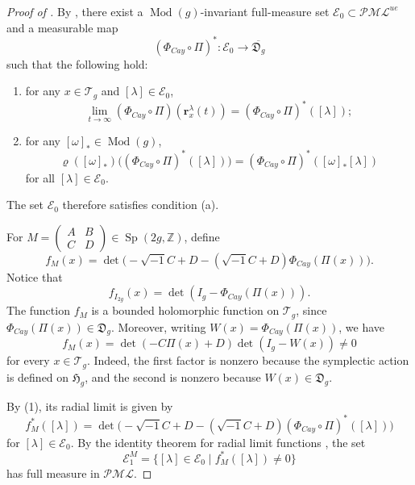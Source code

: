 \documentclass[dvipdfmx]{amsart}
\theoremstyle{remark}
\newcommand{\teich}{\mathcal{T}}
\newcommand{\tmod}{\operatorname{Mod}}
\newcommand{\ray}{{\boldsymbol r}}
\newcommand{\pml}{\mathcal{PML}}
\newcommand{\syp}{\mathop{Sp}}
\newcommand{\symrep}{\mathop{\boldsymbol{\varrho}}}
\newcommand{\Cayley}{\Phi_{C\!a\!y}}
\begin{document}
\begin{proof}[Proof of ]
By \cite[Theorem 3.1]{Miyachi2024Bounded},
there exist a $\tmod(g)$-invariant full-measure set
$\mathcal{E}_0\subset \mathcal{PML}^{ue}$ and a measurable map
\[
(\Cayley\circ\Pi)^*\colon
\mathcal E_0\to\overline{\mathfrak D_g}
\]
such that the following hold:
\begin{enumerate}
\item[(1)] for any $x\in \teich_{g}$ and $[\lambda]\in \mathcal{E}_0$,
\[
\lim_{t\to \infty}(\Cayley\circ\Pi)(\ray^{\lambda}_x(t))
=
(\Cayley\circ\Pi)^*([\lambda]);
\]
\item[(2)] for any $[\omega]_*\in \tmod(g)$,
\[
\symrep([\omega]_*)\bigl((\Cayley\circ\Pi)^*([\lambda])\bigr)
=
(\Cayley\circ\Pi)^*([\omega]_*[\lambda])
\]
for all $[\lambda]\in \mathcal{E}_0$.
\end{enumerate}
The set $\mathcal E_0$ therefore satisfies condition (a).

For
$M=\begin{pmatrix} A & B \\ C & D\end{pmatrix}\in \syp(2g,\mathbb{Z})$, define
\[
f_M(x)
=
\det\bigl(-\sqrt{-1}C+D-(\sqrt{-1}C+D)\Cayley(\Pi(x))\bigr).
\]
Notice that
\[
f_{I_{2g}}(x)=\det(I_g-\Cayley(\Pi(x))).
\]
The function $f_M$ is a bounded holomorphic function on $\teich_{g}$, since
$\Cayley(\Pi(x))\in \mathfrak{D}_g$.
Moreover, writing $W(x)=\Cayley(\Pi(x))$, we have
\[
f_M(x)
=
\det(-C\Pi(x)+D)\det(I_g-W(x))
\ne0
\]
for every $x\in\teich_g$.
Indeed, the first factor is nonzero because the
symplectic action is defined on $\mathfrak H_g$,
and the second is nonzero because
$W(x)\in\mathfrak D_g$.

By (1), its radial limit is given by
\[
f_M^*([\lambda])
=
\det\bigl(-\sqrt{-1}C+D-(\sqrt{-1}C+D)(\Cayley\circ \Pi)^*([\lambda])\bigr)
\]
for $[\lambda]\in \mathcal{E}_0$.
By the identity theorem for radial limit functions \cite[Theorem 1.2]{Miyachi2024Bounded}, the set
\[
\mathcal{E}_1^M
=
\{[\lambda]\in \mathcal{E}_0\mid f_M^*([\lambda])\ne 0\}
\]
has full measure in $\pml$.


\end{proof}
\end{document}
